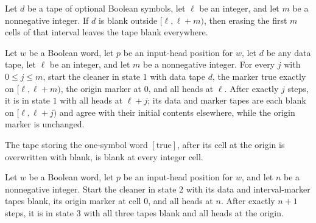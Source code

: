 \begin{lemma}
\label{Turing.FinTM.emCall_cleared_all}
\leanok
{}
Let $d$ be a tape of optional Boolean symbols, let $\ell$ be an integer, and let $m$ be
a nonnegative integer. If $d$ is blank outside $[\ell,\ell+m)$, then erasing the first
$m$ cells of that interval leaves the tape blank everywhere.
\end{lemma}

\begin{lemma}
\label{Turing.FinTM.emCall_clear_scan}
\leanok
{}
Let $w$ be a Boolean word, let $p$ be an input-head position for $w$, let $d$ be any
data tape, let $\ell$ be an integer, and let $m$ be a nonnegative integer. For every $j$
with $0\le j\le m$, start the cleaner in state $1$ with data tape $d$, the marker true
exactly on $[\ell,\ell+m)$, the origin marker at $0$, and all heads at $\ell$. After
exactly $j$ steps, it is in state $1$ with all heads at $\ell+j$; its data and marker
tapes are each blank on $[\ell,\ell+j)$ and agree with their initial contents elsewhere,
while the origin marker is unchanged.
\end{lemma}

\begin{lemma}
\label{Turing.FinTM.emCall_origin_erase}
\leanok
{}
The tape storing the one-symbol word $[\mathrm{true}]$, after its cell at the origin is
overwritten with blank, is blank at every integer cell.
\end{lemma}

\begin{lemma}
\label{Turing.FinTM.emCall_clear_origin}
\leanok
{}
Let $w$ be a Boolean word, let $p$ be an input-head position for $w$, and let $n$ be a
nonnegative integer. Start the cleaner in state $2$ with its data and interval-marker
tapes blank, its origin marker at cell $0$, and all heads at $n$. After exactly $n+1$
steps, it is in state $3$ with all three tapes blank and all heads at the origin.
\end{lemma}

